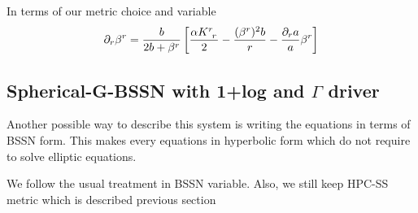 \documentclass[prd]{revtex4}
\begin{document}
In terms of our metric choice and variable
\begin{align}
\partial_r \beta^r = \frac{b}{2b+\beta^r} \left[\frac{\alpha K\indices{^r_r}}{2} - \frac{(\beta^r)^2 b}{r}- \frac{\partial_r a}{a} \beta^r \right]
\end{align}

\subsection{Spherical-G-BSSN with 1+log and $\Gamma$ driver}
Another possible way to describe this system is writing the equations in terms of BSSN form. This makes every equations
in hyperbolic form which do not require to solve elliptic equations.

We follow the usual treatment in BSSN variable. Also, we still keep HPC-SS metric which is described previous section
\end{document}
